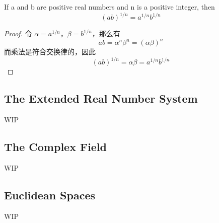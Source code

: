 \documentclass[../poma-note.tex]{subfiles}
\begin{document}
\begin{corollary}
	If a and b are positive real numbers and n is a positive integer, then
	\[(ab)^{1/n} = a^{1/n}b^{1/n}\]
\end{corollary}

\begin{proof}
	令 $\alpha = a^{1/n}$，$\beta = b^{1/n}$，那么有
	\[ab = \alpha^n \beta^n = (\alpha\beta)^n\]
	而乘法是符合交换律的，因此
	\[(ab)^{1/n} = \alpha\beta = a^{1/n}b^{1/n}\]
\end{proof}

\subsection*{The Extended Real Number System}

WIP

\subsection*{The Complex Field}

WIP

\subsection*{Euclidean Spaces}

WIP
\end{document}
